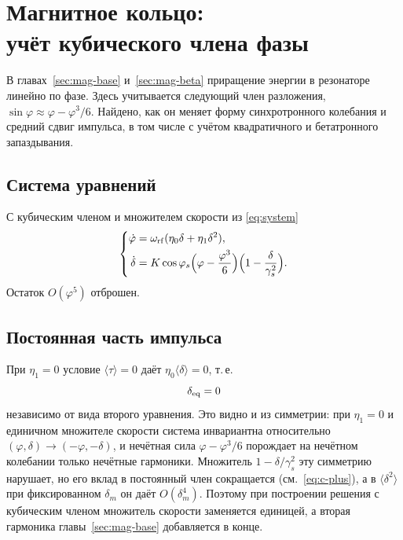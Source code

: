 \section[Магнитное кольцо: учёт кубического члена фазы]{Магнитное кольцо:\\ учёт кубического члена фазы}
\label{sec:mag-phase}

В главах~\ref{sec:mag-base} и~\ref{sec:mag-beta} приращение энергии в резонаторе линейно по фазе. Здесь учитывается следующий член разложения, $\sin\varphi\approx\varphi-\varphi^3/6$. Найдено, как он меняет форму синхротронного колебания и средний сдвиг импульса, в том числе с учётом квадратичного и бетатронного запаздывания.

\subsection{Система уравнений}

С кубическим членом и множителем скорости из \eqref{eq:system}
\begin{equation}
\label{eq:system-phi}
\left\{
\begin{aligned}
\dot\varphi
&=\omega_{\mathrm{rf}}(\eta_0\delta+\eta_1\delta^2),\\
\dot\delta
&=K\cos\varphi_s\Bigl(\varphi-\frac{\varphi^3}{6}\Bigr)
\Bigl(1-\frac{\delta}{\gamma_s^2}\Bigr).
\end{aligned}
\right.
\end{equation}
Остаток $O(\varphi^5)$ отброшен.

\subsection{Постоянная часть импульса}

При $\eta_1=0$ условие $\langle\tau\rangle=0$ даёт $\eta_0\langle\delta\rangle=0$, т.\,е.
\begin{equation}
\label{eq:deq-zero}
\delta_{\mathrm{eq}}=0
\end{equation}
независимо от вида второго уравнения. Это видно и из симметрии: при $\eta_1=0$ и единичном множителе скорости система инвариантна относительно $(\varphi,\delta)\to(-\varphi,-\delta)$, и нечётная сила $\varphi-\varphi^3/6$ порождает на нечётном колебании только нечётные гармоники. Множитель $1-\delta/\gamma_s^2$ эту симметрию нарушает, но его вклад в постоянный член сокращается (см.~\eqref{eq:c-plus}), а в $\langle\delta^2\rangle$ при фиксированном $\delta_m$ он даёт $O(\delta_m^4)$. Поэтому при построении решения с кубическим членом множитель скорости заменяется единицей, а вторая гармоника главы~\ref{sec:mag-base} добавляется в конце.

